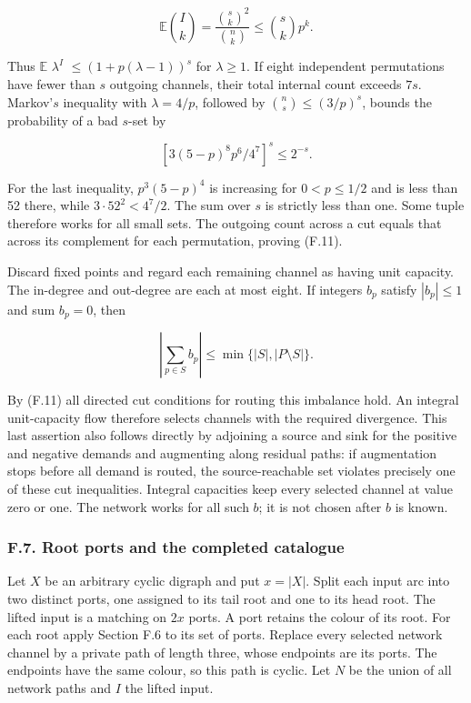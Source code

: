 \documentclass[english,11pt,a4paper]{article}
\begin{document}
\[\mathbb E\binom Ik=\frac{\binom sk^2}{\binom nk}\le\binom skp^k.\]

Thus \(\mathbb E\) \(\lambda^{I}\) \(\le (1+p(\lambda-1))^{s}\) for \(\lambda\ge 1\). If eight independent permutations have fewer than \(s\) outgoing channels, their total internal count exceeds \(7s\). Markov'\(s\) inequality with \(\lambda=4/p\), followed by \(\binom{n}{s}\le (3/p)^{s}\), bounds the probability of a bad \(s\)-set by

\[\left[3(5-p)^8p^6/4^7\right]^s\le2^{-s}.\]

For the last inequality, \(p^{3}(5-p)^{4}\) is increasing for \(0<p\le 1/2\) and is less than 52 there, while \(3\cdot 52^{2}<4^{7}/2\). The sum over \(s\) is strictly less than one. Some tuple therefore works for all small sets. The outgoing count across a cut equals that across its complement for each permutation, proving (F.11).

Discard fixed points and regard each remaining channel as having unit capacity. The in-degree and out-degree are each at most eight. If integers \(b_{p}\) satisfy \(|b_{p}|\le 1\) and sum \(b_{p}=0\), then

\[\left|\sum_{p\in S}b_p\right|\le\min\{|S|,|P\setminus S|\}.\]

By (F.11) all directed cut conditions for routing this imbalance hold. An integral unit-capacity flow therefore selects channels with the required divergence. This last assertion also follows directly by adjoining a source and sink for the positive and negative demands and augmenting along residual paths: if augmentation stops before all demand is routed, the source-reachable set violates precisely one of these cut inequalities. Integral capacities keep every selected channel at value zero or one. The network works for all such \(b\); it is not chosen after \(b\) is known.

\subsubsection{F.7. Root ports and the completed catalogue}\label{f.7.-root-ports-and-the-completed-catalogue}

Let \(X\) be an arbitrary cyclic digraph and put \(x=|X|\). Split each input arc into two distinct ports, one assigned to its tail root and one to its head root. The lifted input is a matching on \(2x\) ports. A port retains the colour of its root. For each root apply Section F.6 to its set of ports. Replace every selected network channel by a private path of length three, whose endpoints are its ports. The endpoints have the same colour, so this path is cyclic. Let \(N\) be the union of all network paths and \(I\) the lifted input.
\end{document}
